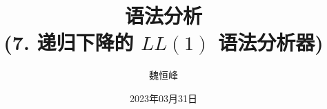 \documentclass[]{beamer}
\title[语法分析]{语法分析 \\ (7. 递归下降的 $LL(1)$ 语法分析器)}
\author[魏恒峰]{\large 魏恒峰}
\institute{hfwei@nju.edu.cn}
\date{2023年03月31日}
\begin{document}
\maketitle



\thankyou{}

\end{document}
